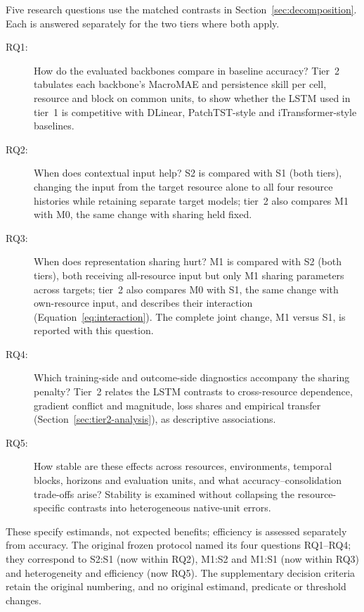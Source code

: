\documentclass[5p,twocolumn]{elsarticle}
\begin{document}
Five research questions use the matched contrasts in
Section~\ref{sec:decomposition}. Each is answered separately for the two
tiers where both apply.

\begin{description}
  \item[RQ1:] How do the evaluated backbones compare in baseline accuracy?
    Tier~2 tabulates each backbone's MacroMAE and persistence skill per cell,
    resource and block on common units, to show whether the LSTM used in
    tier~1 is competitive with DLinear, PatchTST-style and
    iTransformer-style baselines.
  \item[RQ2:] When does contextual input help? S2 is compared with S1 (both
    tiers), changing the input from the target resource alone to all four
    resource histories while retaining separate target models; tier~2 also
    compares M1 with M0, the same change with sharing held fixed.
  \item[RQ3:] When does representation sharing hurt? M1 is compared with S2
    (both tiers), both receiving all-resource input but only M1 sharing
    parameters across targets; tier~2 also compares M0 with S1, the same
    change with own-resource input, and describes their interaction
    (Equation~\ref{eq:interaction}). The complete joint change, M1 versus S1,
    is reported with this question.
  \item[RQ4:] Which training-side and outcome-side diagnostics accompany the
    sharing penalty? Tier~2 relates the LSTM contrasts to cross-resource
    dependence, gradient conflict and magnitude, loss shares and empirical
    transfer (Section~\ref{sec:tier2-analysis}), as descriptive associations.
  \item[RQ5:] How stable are these effects across resources, environments,
    temporal blocks, horizons and evaluation units, and what
    accuracy--consolidation trade-offs arise? Stability is examined without
    collapsing the resource-specific contrasts into heterogeneous native-unit
    errors.
\end{description}

These specify estimands, not expected benefits; efficiency is assessed
separately from accuracy. The original frozen protocol named its four
questions RQ1--RQ4; they correspond to S2:S1 (now within RQ2), M1:S2 and
M1:S1 (now within RQ3) and heterogeneity and efficiency (now RQ5). The
supplementary decision criteria retain the original numbering, and no
original estimand, predicate or threshold changes.
\end{document}
